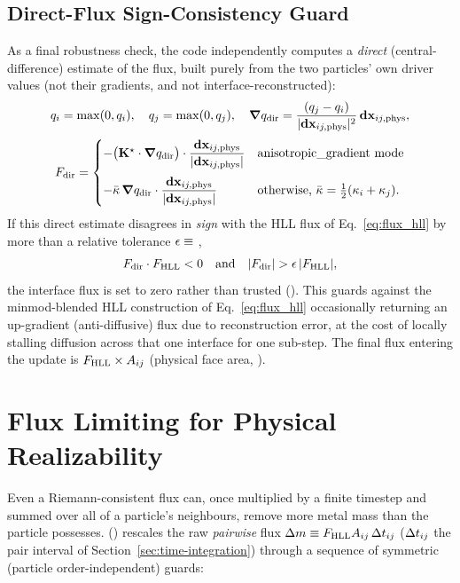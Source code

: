 \subsection{Direct-Flux Sign-Consistency Guard}
\label{sec:anti-diffusion-guard}
As a final robustness check, the code independently computes a
\emph{direct} (central-difference) estimate of the flux, built purely
from the two particles' own driver values (not their gradients, and not
interface-reconstructed):
\begin{equation}
  q_i = \max(0,q_i) , \quad q_j=\max(0,q_j) , \quad
  \grad q_{\rm dir} = \frac{(q_j-q_i)}{|\mathbf{dx}_{ij,\rm phys}|^2}\,\mathbf{dx}_{ij,\rm phys} ,
\end{equation}
\begin{equation}
  F_{\rm dir} =
  \begin{cases}
    -\big(\mathbf{K}^{\star}\cdot\grad q_{\rm dir}\big)\cdot \dfrac{\mathbf{dx}_{ij,\rm phys}}{|\mathbf{dx}_{ij,\rm phys}|}
      & \text{anisotropic\_gradient mode} \\[1.2em]
    -\bar\kappa\, \grad q_{\rm dir}\cdot \dfrac{\mathbf{dx}_{ij,\rm phys}}{|\mathbf{dx}_{ij,\rm phys}|}
      & \text{otherwise, } \bar\kappa=\tfrac12(\kappa_i+\kappa_j) .
  \end{cases}
\end{equation}
If this direct estimate disagrees in \emph{sign} with the HLL flux of
Eq.~\eqref{eq:flux_hll} by more than a relative tolerance
$\epsilon \equiv$ ,
\begin{equation}
  F_{\rm dir}\cdot F_{\rm HLL} < 0
  \quad\text{and}\quad
  |F_{\rm dir}| > \epsilon\, |F_{\rm HLL}| ,
\end{equation}
the interface flux is set to zero rather than trusted
(). This guards against
the minmod-blended HLL construction of Eq.~\eqref{eq:flux_hll}
occasionally returning an up-gradient (anti-diffusive) flux due to
reconstruction error, at the cost of locally stalling diffusion across
that one interface for one sub-step. The final flux entering the update
is $F_{\rm HLL}\times A_{ij}$ (physical face area,
).

\section{Flux Limiting for Physical Realizability}
\label{sec:flux-limiter}

Even a Riemann-consistent flux can, once multiplied by a finite timestep
and summed over all of a particle's neighbours, remove more metal mass
than the particle possesses. 
() rescales the raw \emph{pairwise} flux
$\Delta m \equiv F_{\rm HLL}A_{ij}\, \Delta t_{ij}$ ($\Delta t_{ij}$ the pair
interval of Section~\ref{sec:time-integration}) through a sequence of
symmetric (particle order-independent) guards:


